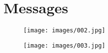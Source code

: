 
\chapter*{Messages}

\begin{figure}
\texttt{[image: images/002.jpg]}
\end{figure}


\begin{figure}
\texttt{[image: images/003.jpg]}
\end{figure}

